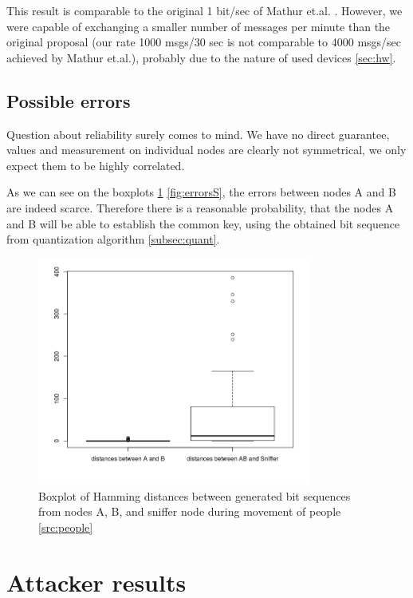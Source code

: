 \documentclass[
  print, %
  Table,   %
  nolof,     %
  nolot,     %
           oneside
]{fithesis3}
\begin{document}
  This result is comparable to the original 1 bit/sec of Mathur et.al. \cite{Mathur2008Rssi}. However, we were capable of exchanging a smaller number of messages per minute than the original proposal (our rate 1000 msgs/30 sec is not comparable to 4000 msgs/sec achieved by Mathur et.al.), probably due to the nature of used devices \ref{sec:hw}.


  \subsection{Possible errors}
  Question about reliability surely comes to mind. We have no direct guarantee, values and measurement on individual nodes are clearly not symmetrical, we only expect them to be highly correlated.

  As we can see on the boxplots \ref{fig:errorsT} \ref{fig:errorsS}, the errors between nodes A and B are indeed scarce. Therefore there is a reasonable probability, that the nodes A and B will be able to establish the common key, using the obtained bit sequence from quantization algorithm \ref{subsec:quant}.


  \begin{figure}

    \includegraphics[width=0.8\textwidth]{../images/boxplotDistancesTeaching.png}
  \caption{Boxplot of Hamming distances between generated bit sequences from nodes A, B, and sniffer node during movement of people \ref{src:people}}
  \label{fig:errorsT}
  \end{figure}





\section{Attacker results}
\end{document}
